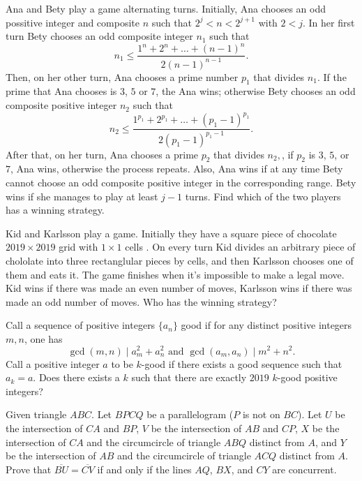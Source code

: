 \documentclass[11pt]{scrartcl}
\begin{document}
\begin{problem}[299125558562230]
	Ana and Bety play a game alternating turns. Initially, Ana chooses an odd possitive integer and composite $n$ such that $2^j<n<2^{j+1}$ with $2<j$. In her first turn Bety chooses an odd composite integer $n_1$ such that
\[n_1\leq \frac{1^n+2^n+\dots+(n-1)^n}{2(n-1)^{n-1}}.\]Then, on her other turn, Ana chooses a prime number $p_1$ that divides $n_1$. If the prime that Ana chooses is $3$, $5$ or $7$, the Ana wins; otherwise Bety chooses an odd composite positive integer $n_2$ such that\[n_2\leq \frac{1^{p_1}+2^{p_1}+\dots+(p_1-1)^{p_1}}{2(p_1-1)^{p_1-1}}.\]After that, on her turn, Ana chooses a prime $p_2$ that divides $n_2,$, if $p_2$ is $3$, $5$, or $7$, Ana wins, otherwise the process repeats. Also, Ana wins if at any time Bety cannot choose an odd composite positive integer in the corresponding range. Bety wins if she manages to play at least $j-1$ turns. Find which of the two players has a winning strategy.
\end{problem}
\begin{problem}[300334293164389]
	Kid and Karlsson play a game. Initially they have a square piece of chocolate $2019\times 2019$ grid with $1\times 1$ cells . On every turn Kid divides an arbitrary piece of chololate into three rectanglular pieces by cells, and then Karlsson chooses one of them and eats it. The game finishes when it's impossible to make a legal move. Kid wins if there was made an even number of moves, Karlsson wins if there was made an odd number of moves.
Who has the winning strategy?
\end{problem}
\begin{problem}[300577925092089]
Call a sequence of positive integers $\{a_n\}$ good if for any distinct positive integers $m,n$, one has
$$\gcd(m,n) \mid a_m^2 + a_n^2 \text{ and } \gcd(a_m,a_n) \mid m^2 + n^2.$$Call a positive integer $a$ to be $k$-good if there exists a good sequence such that $a_k = a$. Does there exists a $k$ such that there are exactly $2019$ $k$-good positive integers?
\end{problem}
\begin{problem}[302438226120877]
	Given triangle $ABC$. Let $BPCQ$ be a parallelogram ($P$ is not on $BC$). Let $U$ be the intersection of $CA$ and $BP$, $V$ be the intersection of $AB$ and $CP$, $X$ be the intersection of $CA$ and the circumcircle of triangle $ABQ$ distinct from $A$, and $Y$ be the intersection of $AB$ and the circumcircle of triangle $ACQ$ distinct from $A$.
Prove that $\overline{BU} = \overline{CV}$ if and only if the lines $AQ$, $BX$, and $CY$ are concurrent.
\end{problem}
\end{document}
